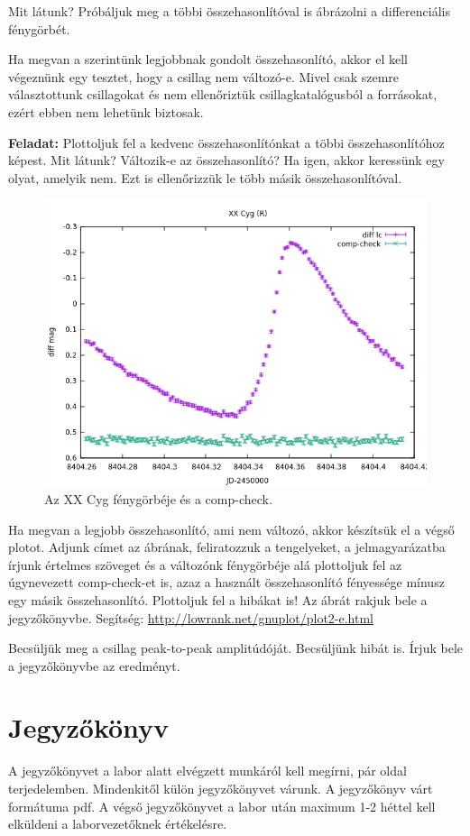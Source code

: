 \documentclass{article}
\begin{document}
Mit látunk? Próbáljuk meg a többi összehasonlítóval is ábrázolni a
differenciális fénygörbét.

Ha megvan a szerintünk legjobbnak gondolt összehasonlító, akkor el kell
végeznünk egy tesztet, hogy a csillag nem változó-e. Mivel csak szemre
választottunk csillagokat és nem ellenőriztük csillagkatalógusból a forrásokat,
ezért ebben nem lehetünk biztosak.

{\bf Feladat:}
Plottoljuk fel a kedvenc összehasonlítónkat a többi összehasonlítóhoz képest.
Mit látunk? Változik-e az összehasonlító? Ha igen, akkor keressünk egy olyat,
amelyik nem. Ezt is ellenőrizzük le több másik összehasonlítóval.

\begin{figure}[ht!]
    \centering
    \includegraphics[width=0.65\linewidth]{pics/lc.png}
    \caption{Az XX Cyg fénygörbéje és a comp-check.}
    \label{apert}
\end{figure}

Ha megvan a legjobb összehasonlító, ami nem változó, akkor készítsük el a
végső plotot. Adjunk címet az ábrának, feliratozzuk a tengelyeket, a
jelmagyarázatba írjunk értelmes szöveget és a változónk fénygörbéje alá
plottoljuk fel az úgynevezett comp-check-et is, azaz a használt összehasonlító
fényessége mínusz egy másik összehasonlító. Plottoljuk fel a hibákat is!
Az ábrát rakjuk bele a jegyzőkönyvbe.
Segítség:
\url{http://lowrank.net/gnuplot/plot2-e.html}

Becsüljük meg a csillag peak-to-peak amplitúdóját. Becsüljünk hibát is.
Írjuk bele a jegyzőkönyvbe az eredményt.

\section{Jegyzőkönyv}

A jegyzőkönyvet a labor alatt elvégzett munkáról kell megírni, pár oldal
terjedelemben. Mindenkitől külön jegyzőkönyvet várunk. A jegyzőkönyv várt
formátuma pdf. A végső jegyzőkönyvet a labor után maximum 1-2 héttel kell
elküldeni a laborvezetőknek értékelésre.

\end{document}
